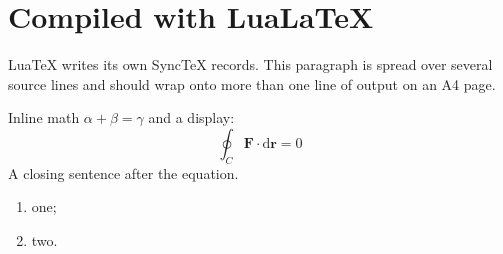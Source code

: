 \documentclass[a4paper,11pt]{article}
\begin{document}
\section{Compiled with LuaLaTeX}
LuaTeX writes its own SyncTeX records. This paragraph is spread over
several source lines and should wrap onto more than one line of
output on an A4 page.

Inline math $\alpha + \beta = \gamma$ and a display:
\begin{equation}
  \oint_C \mathbf{F}\cdot\mathrm{d}\mathbf{r} = 0
\end{equation}
A closing sentence after the equation.

\begin{enumerate}
  \item one;
  \item two.
\end{enumerate}
\end{document}
